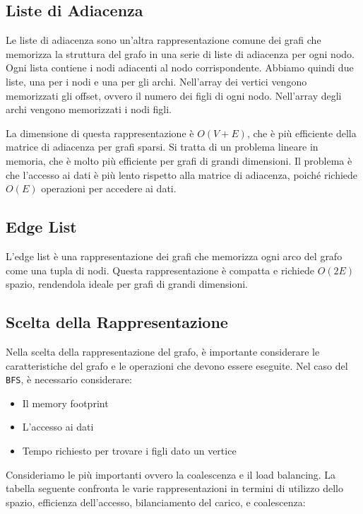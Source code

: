 \subsection{Liste di Adiacenza}

Le liste di adiacenza sono un'altra rappresentazione comune dei grafi
che memorizza la struttura del grafo in una serie di liste di adiacenza
per ogni nodo. Ogni lista contiene i nodi adiacenti al nodo corrispondente. Abbiamo quindi due liste, una per i nodi e una per gli archi. Nell'array dei vertici vengono memorizzati gli offset, ovvero il numero dei figli di ogni nodo. Nell'array degli archi vengono memorizzati i nodi figli.

La dimensione di questa rappresentazione è \(O(V + E)\), che è più
efficiente della matrice di adiacenza per grafi sparsi. Si tratta di un problema lineare in memoria, che è molto più efficiente per grafi di grandi dimensioni. Il problema è che l'accesso ai dati è più lento rispetto alla matrice di adiacenza, poiché richiede \(O(E)\) operazioni per accedere ai dati.

\subsection{Edge List}

L'edge list è una rappresentazione dei grafi che memorizza ogni arco del
grafo come una tupla di nodi. Questa rappresentazione è compatta e
richiede \(O(2E)\) spazio, rendendola ideale per grafi di grandi dimensioni.


\subsection{Scelta della Rappresentazione}
Nella scelta della rappresentazione del grafo, è importante
considerare le caratteristiche del grafo e le operazioni
che devono essere eseguite. Nel caso del \texttt{BFS}, è necessario considerare:
\begin{itemize}
  \item Il memory footprint
  \item L'accesso ai dati
  \item Tempo richiesto per trovare i figli dato un vertice
\end{itemize}

Consideriamo le più importanti ovvero la coalescenza e 
il load balancing. La tabella seguente confronta le varie rappresentazioni
in termini di utilizzo dello spazio, efficienza dell'accesso, bilanciamento
del carico, e coalescenza:

